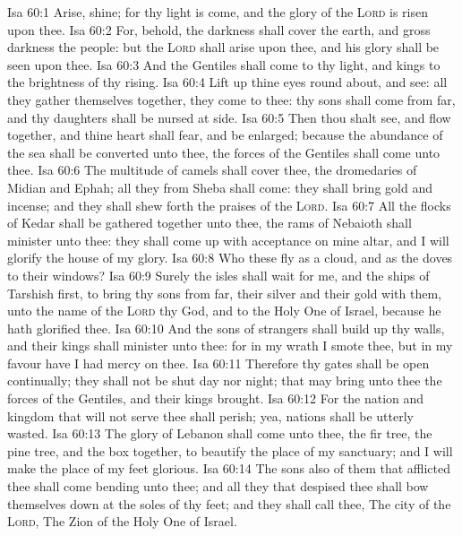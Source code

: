 \vs Isa 60:1 Arise, shine; for thy light is come, and the glory of the \textsc{Lord} is risen upon thee.
\vs Isa 60:2 For, behold, the darkness shall cover the earth, and gross darkness the people: but the \textsc{Lord} shall arise upon thee, and his glory shall be seen upon thee.
\vs Isa 60:3 And the Gentiles shall come to thy light, and kings to the brightness of thy rising.
\vs Isa 60:4 Lift up thine eyes round about, and see: all they gather themselves together, they come to thee: thy sons shall come from far, and thy daughters shall be nursed at  side.
\vs Isa 60:5 Then thou shalt see, and flow together, and thine heart shall fear, and be enlarged; because the abundance of the sea shall be converted unto thee, the forces of the Gentiles shall come unto thee.
\vs Isa 60:6 The multitude of camels shall cover thee, the dromedaries of Midian and Ephah; all they from Sheba shall come: they shall bring gold and incense; and they shall shew forth the praises of the \textsc{Lord}.
\vs Isa 60:7 All the flocks of Kedar shall be gathered together unto thee, the rams of Nebaioth shall minister unto thee: they shall come up with acceptance on mine altar, and I will glorify the house of my glory.
\vs Isa 60:8 Who  these  fly as a cloud, and as the doves to their windows?
\vs Isa 60:9 Surely the isles shall wait for me, and the ships of Tarshish first, to bring thy sons from far, their silver and their gold with them, unto the name of the \textsc{Lord} thy God, and to the Holy One of Israel, because he hath glorified thee.
\vs Isa 60:10 And the sons of strangers shall build up thy walls, and their kings shall minister unto thee: for in my wrath I smote thee, but in my favour have I had mercy on thee.
\vs Isa 60:11 Therefore thy gates shall be open continually; they shall not be shut day nor night; that  may bring unto thee the forces of the Gentiles, and  their kings  brought.
\vs Isa 60:12 For the nation and kingdom that will not serve thee shall perish; yea,  nations shall be utterly wasted.
\vs Isa 60:13 The glory of Lebanon shall come unto thee, the fir tree, the pine tree, and the box together, to beautify the place of my sanctuary; and I will make the place of my feet glorious.
\vs Isa 60:14 The sons also of them that afflicted thee shall come bending unto thee; and all they that despised thee shall bow themselves down at the soles of thy feet; and they shall call thee, The city of the \textsc{Lord}, The Zion of the Holy One of Israel.
